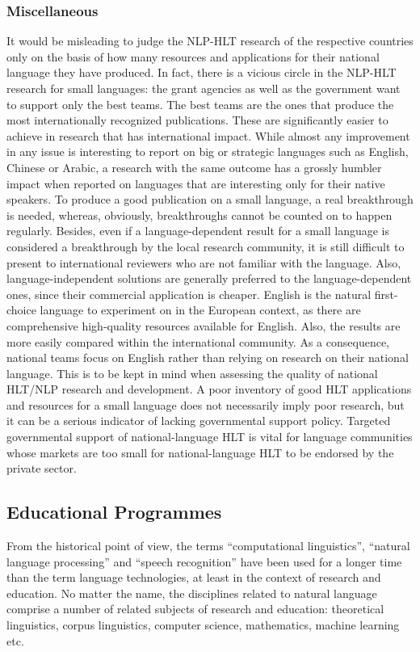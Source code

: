 \begin{multicols}{2}
\subsubsection{Miscellaneous}

It would be misleading to judge the NLP-HLT research of the respective countries only on the basis of how many resources and applications for their national language they have produced. In fact, there is a vicious circle in the NLP-HLT research for small languages: the grant agencies as well as the government want to support only the best teams. The best teams are the ones that produce the most internationally recognized publications. These are significantly easier to achieve in research that has international impact. While almost any improvement in any issue is interesting to report on big or strategic languages such as English, Chinese or Arabic, a research with the same outcome has a grossly humbler impact when reported on languages that are interesting only for their native speakers. To produce a good publication on a small language, a real breakthrough is needed, whereas, obviously, breakthroughs cannot be counted on to happen regularly.  Besides, even if a language-dependent result for a small language is considered a breakthrough by the local research community, it is still difficult to present to international reviewers who are not familiar with the language.
Also, language-independent solutions are generally preferred to the language-dependent ones, since their commercial application is cheaper. English is the natural first-choice language to experiment on in the European context, as there are comprehensive high-quality resources available for English. Also, the results are more easily compared within the international community.
As a consequence, national teams focus on English rather than relying on research on their national language. This is to be kept in mind when assessing the quality of national HLT/NLP research and development. A poor inventory of good HLT applications and resources for a small language does not necessarily imply poor research, but it can be a serious indicator of lacking governmental support policy. Targeted governmental support of national-language HLT is vital for language communities whose markets are too small for national-language HLT to be endorsed by the private sector.
 
\subsection{Educational Programmes}
From the historical point of view, the terms ``computational linguistics'', ``natural language processing'' and ``speech recognition'' have been used for a longer time than the term language technologies, at least in the context of research and education. No matter the name, the disciplines related to natural language comprise a number of related subjects of research and education: theoretical linguistics, corpus linguistics, computer science, mathematics, machine learning etc.


\end{multicols}
